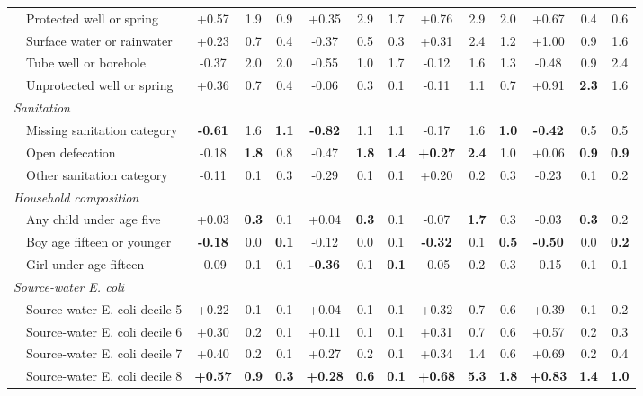 \begin{landscape}
\begin{table}[p]
\begin{adjustbox}{max width=\textwidth,center}
\begin{tabular}{ll*{12}{c}}
 & Protected well or spring & +0.57 & 1.9 & 0.9 & +0.35 & 2.9 & 1.7 & +0.76 & 2.9 & 2.0 & +0.67 & 0.4 & 0.6 \\
 & Surface water or rainwater & +0.23 & 0.7 & 0.4 & -0.37 & 0.5 & 0.3 & +0.31 & 2.4 & 1.2 & +1.00 & 0.9 & 1.6 \\
 & Tube well or borehole & -0.37 & 2.0 & 2.0 & -0.55 & 1.0 & 1.7 & -0.12 & 1.6 & 1.3 & -0.48 & 0.9 & 2.4 \\
 & Unprotected well or spring & +0.36 & 0.7 & 0.4 & -0.06 & 0.3 & 0.1 & -0.11 & 1.1 & 0.7 & +0.91 & \textbf{2.3} & 1.6 \\
\multicolumn{14}{l}{\textit{Sanitation}} \\
 & Missing sanitation category & \textbf{-0.61} & 1.6 & \textbf{1.1} & \textbf{-0.82} & 1.1 & 1.1 & -0.17 & 1.6 & \textbf{1.0} & \textbf{-0.42} & 0.5 & 0.5 \\
 & Open defecation & -0.18 & \textbf{1.8} & 0.8 & -0.47 & \textbf{1.8} & \textbf{1.4} & \textbf{+0.27} & \textbf{2.4} & 1.0 & +0.06 & \textbf{0.9} & \textbf{0.9} \\
 & Other sanitation category & -0.11 & 0.1 & 0.3 & -0.29 & 0.1 & 0.1 & +0.20 & 0.2 & 0.3 & -0.23 & 0.1 & 0.2 \\
\multicolumn{14}{l}{\textit{Household composition}} \\
 & Any child under age five & +0.03 & \textbf{0.3} & 0.1 & +0.04 & \textbf{0.3} & 0.1 & -0.07 & \textbf{1.7} & 0.3 & -0.03 & \textbf{0.3} & 0.2 \\
 & Boy age fifteen or younger & \textbf{-0.18} & 0.0 & \textbf{0.1} & -0.12 & 0.0 & 0.1 & \textbf{-0.32} & 0.1 & \textbf{0.5} & \textbf{-0.50} & 0.0 & \textbf{0.2} \\
 & Girl under age fifteen & -0.09 & 0.1 & 0.1 & \textbf{-0.36} & 0.1 & \textbf{0.1} & -0.05 & 0.2 & 0.3 & -0.15 & 0.1 & 0.1 \\
\multicolumn{14}{l}{\textit{Source-water E. coli}} \\
 & Source-water E. coli decile 5 & +0.22 & 0.1 & 0.1 & +0.04 & 0.1 & 0.1 & +0.32 & 0.7 & 0.6 & +0.39 & 0.1 & 0.2 \\
 & Source-water E. coli decile 6 & +0.30 & 0.2 & 0.1 & +0.11 & 0.1 & 0.1 & +0.31 & 0.7 & 0.6 & +0.57 & 0.2 & 0.3 \\
 & Source-water E. coli decile 7 & +0.40 & 0.2 & 0.1 & +0.27 & 0.2 & 0.1 & +0.34 & 1.4 & 0.6 & +0.69 & 0.2 & 0.4 \\
 & Source-water E. coli decile 8 & \textbf{+0.57} & \textbf{0.9} & \textbf{0.3} & \textbf{+0.28} & \textbf{0.6} & \textbf{0.1} & \textbf{+0.68} & \textbf{5.3} & \textbf{1.8} & \textbf{+0.83} & \textbf{1.4} & \textbf{1.0} \\

\end{tabular}
\end{adjustbox}
\end{table}
\end{landscape}
